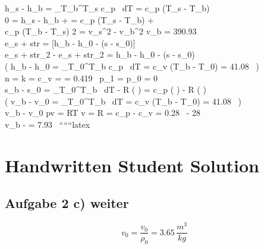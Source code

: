 h_s - h_{b} = \int_{T_b}^{T_s} c_p \, dT = c_p (T_s - T_b) \\

0 = h_s - h_b +  = c_p (T_s - T_b) +  \\

c_p (T_b - T_s) 2 = v_s^2 - v_b^2 \quad \Rightarrow \quad v_b = 390.93 \,  \\

 \quad e_{s + str} = [h_b - h_0 -  (s - s_0)] \quad {} \\

e_{s + str_2} - e_{s + str_2} = h_b - h_0 -  (s - s_0) \quad {} \\

\left( h_b - h_0 = \int_{T_0}^{T_b} c_p \, dT = c_v (T_b - T_0) = 41.08 \,  \right) \quad {} \\

n = k =  \quad \leftarrow c_v =  = 0.419 \,  \quad p_1 = p_0 \quad {} = 0 \\

s_b - s_0 = \int_{T_0}^{T_b}  \, dT - R \ln \left(  \right) = c_p \ln \left(  \right) - R \ln \left(  \right) \\

\left( v_b - v_0 = \int_{T_0}^{T_b}  \, dT = c_v (T_b - T_0) = 41.08 \,  \right) \quad {} \\

v_b - v_0 \quad pv = RT \quad v =  \quad R =  \quad c_p - c_v = 0.28 \,  \quad - 28 \,  \\

v_b -  = 7.93 \, 
``````latex


\section*{Handwritten Student Solution}

\subsection*{Aufgabe 2 c) weiter}

\[
v_0 = \frac{v_0}{\rho_0} = 3.65 \, \frac{m^3}{kg}
\]

